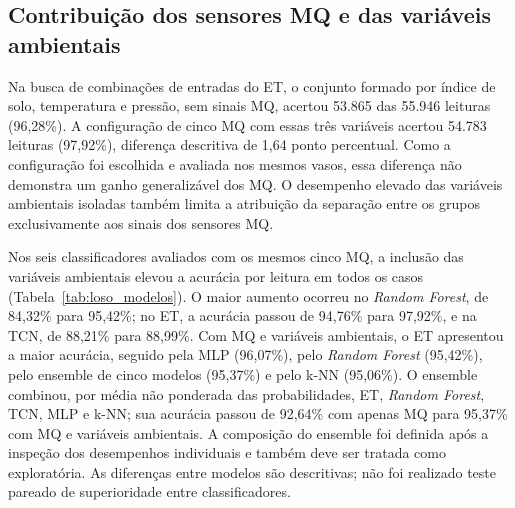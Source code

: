 \subsection{Contribuição dos sensores MQ e das variáveis ambientais}
\label{subsec:res_mq}

Na busca de combinações de entradas do ET, o conjunto formado por índice
de solo, temperatura e pressão, sem sinais MQ, acertou 53.865 das 55.946
leituras (96,28\%). A configuração de cinco MQ com essas três variáveis
acertou 54.783 leituras (97,92\%), diferença descritiva de 1,64 ponto
percentual. Como a configuração foi escolhida e avaliada nos mesmos vasos,
essa diferença não demonstra um ganho generalizável dos MQ. O desempenho
elevado das variáveis ambientais isoladas também limita a atribuição da
separação entre os grupos exclusivamente aos sinais dos sensores MQ.

Nos seis classificadores avaliados com os mesmos cinco MQ, a inclusão
das variáveis ambientais elevou a acurácia por leitura em todos os casos
(Tabela~\ref{tab:loso_modelos}). O maior aumento ocorreu no
\textit{Random Forest}, de 84,32\% para 95,42\%; no ET, a acurácia passou
de 94,76\% para 97,92\%, e na TCN, de 88,21\% para 88,99\%. Com MQ e
variáveis ambientais, o ET apresentou a maior acurácia, seguido pela MLP
(96,07\%), pelo \textit{Random Forest} (95,42\%), pelo ensemble de cinco
modelos (95,37\%) e pelo k-NN (95,06\%). O ensemble combinou, por média
não ponderada das probabilidades, ET, \textit{Random Forest}, TCN, MLP e
k-NN; sua acurácia passou de 92,64\% com apenas MQ para 95,37\% com
MQ e variáveis ambientais. A composição do ensemble foi definida após a
inspeção dos desempenhos individuais e também deve ser tratada como
exploratória.
As diferenças entre modelos são descritivas; não foi realizado teste
pareado de superioridade entre classificadores.

